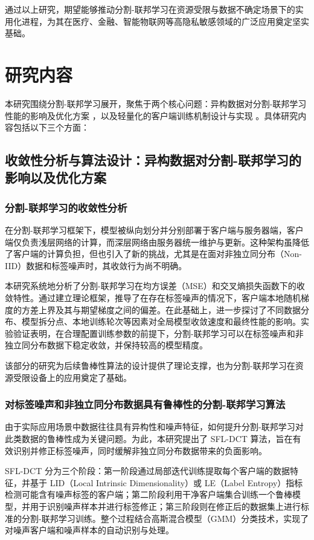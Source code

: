 通过以上研究，期望能够推动分割-联邦学习在资源受限与数据不确定场景下的实用化进程，为其在医疗、金融、智能物联网等高隐私敏感领域的广泛应用奠定坚实基础。

\section{研究内容}
本研究围绕分割-联邦学习展开，聚焦于两个核心问题：异构数据对分割-联邦学习性能的影响及优化方案 ，以及轻量化的客户端训练机制设计与实现 。具体研究内容包括以下三个方面：
\subsection{收敛性分析与算法设计：异构数据对分割-联邦学习的影响以及优化方案}
\subsubsection{分割-联邦学习的收敛性分析}
在分割-联邦学习框架下，模型被纵向划分并分别部署于客户端与服务器端，客户端仅负责浅层网络的计算，而深层网络由服务器统一维护与更新。这种架构虽降低了客户端的计算负担，但也引入了新的挑战，尤其是在面对非独立同分布（Non-IID）数据和标签噪声时，其收敛行为尚不明确。

本研究系统地分析了分割-联邦学习在均方误差（MSE）和交叉熵损失函数下的收敛特性。通过建立理论框架，推导了在存在标签噪声的情况下，客户端本地随机梯度的方差上界及其与期望梯度之间的偏差。在此基础上，进一步探讨了不同数据分布、模型拆分点、本地训练轮次等因素对全局模型收敛速度和最终性能的影响。实验验证表明，在合理配置训练参数的前提下，分割-联邦学习可以在标签噪声和非独立同分布数据下稳定收敛，并保持较高的模型精度。

该部分的研究为后续鲁棒性算法的设计提供了理论支撑，也为分割-联邦学习在资源受限设备上的应用奠定了基础。
\subsubsection{对标签噪声和非独立同分布数据具有鲁棒性的分割-联邦学习算法}
由于实际应用场景中数据往往具有异构性和噪声特征，如何提升分割-联邦学习对此类数据的鲁棒性成为关键问题。为此，本研究提出了 SFL-DCT 算法，旨在有效识别并修正标签噪声，同时缓解非独立同分布数据带来的负面影响。

SFL-DCT 分为三个阶段：第一阶段通过局部迭代训练提取每个客户端的数据特征，并基于 LID（Local Intrinsic Dimensionality）或 LE（Label Entropy）指标检测可能含有噪声标签的客户端；第二阶段利用干净客户端集合训练一个鲁棒模型，并用于识别噪声样本并进行标签修正；第三阶段则在修正后的数据集上进行标准的分割-联邦学习训练。整个过程结合高斯混合模型（GMM）分类技术，实现了对噪声客户端和噪声样本的自动识别与处理。

